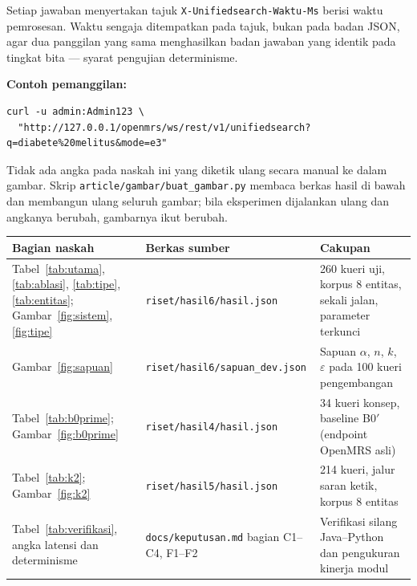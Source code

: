 \vspace{1.5ex}
\noindent
Setiap jawaban menyertakan tajuk \texttt{X-Unifiedsearch-Waktu-Ms} berisi waktu
pemrosesan. Waktu sengaja ditempatkan pada tajuk, bukan pada badan JSON, agar
dua panggilan yang sama menghasilkan badan jawaban yang identik pada tingkat
bita --- syarat pengujian determinisme.

\vspace{1.5ex}
\noindent\textbf{Contoh pemanggilan:}
\begin{verbatim}
curl -u admin:Admin123 \
  "http://127.0.0.1/openmrs/ws/rest/v1/unifiedsearch?q=diabete%20melitus&mode=e3"
\end{verbatim}

\vspace{2ex}

\noindent
Tidak ada angka pada naskah ini yang diketik ulang secara manual ke dalam
gambar. Skrip \texttt{article/gambar/buat\_gambar.py} membaca berkas hasil
di bawah dan membangun ulang seluruh gambar; bila eksperimen dijalankan ulang
dan angkanya berubah, gambarnya ikut berubah.

\vspace{1.5ex}
\renewcommand{\arraystretch}{1.25}
\begin{tabular}{@{}p{}p{}p{}@{}}
\toprule
\textbf{Bagian naskah} & \textbf{Berkas sumber} & \textbf{Cakupan} \\
\midrule
Tabel~\ref{tab:utama}, \ref{tab:ablasi}, \ref{tab:tipe}, \ref{tab:entitas};
Gambar~\ref{fig:sistem}, \ref{fig:tipe} &
\texttt{riset/hasil6/hasil.json} &
260 kueri uji, korpus 8 entitas, sekali jalan, parameter terkunci \\

Gambar~\ref{fig:sapuan} &
\texttt{riset/hasil6/sapuan\_dev.json} &
Sapuan $\alpha$, $n$, $k$, $\varepsilon$ pada 100 kueri pengembangan \\

Tabel~\ref{tab:b0prime}; Gambar~\ref{fig:b0prime} &
\texttt{riset/hasil4/hasil.json} &
34 kueri konsep, baseline B0$'$ (endpoint OpenMRS asli) \\

Tabel~\ref{tab:k2}; Gambar~\ref{fig:k2} &
\texttt{riset/hasil5/hasil.json} &
214 kueri, jalur saran ketik, korpus 8 entitas \\

Tabel~\ref{tab:verifikasi}, angka latensi dan determinisme &
\texttt{docs/keputusan.md} bagian C1--C4, F1--F2 &
Verifikasi silang Java--Python dan pengukuran kinerja modul \\
\bottomrule
\end{tabular}

